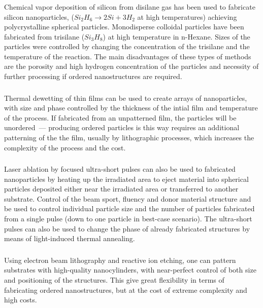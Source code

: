         \subsubsection{}
                Chemical vapor deposition of silicon from disilane gas has been used to fabricate silicon nanoparticles, ($Si_2H_6 \rightarrow 2Si + 3H_2$ at
            high temperatures) achieving polycrystalline spherical particles. Monodisperse colloidal particles have been fabricated from trisilane ($Si_3H_8$)
            at high temperature in n-Hexane. Sizes of the particles were controlled by changing the concentration of the trisilane and the temperature of the
            reaction. The main disadvantages of these types of methods are the porosity and high hydrogen concentration of the particles and necessity of
            further processing if ordered nanostructures are required.

        \subsubsection{}
                Thermal dewetting of thin films can be used to create arrays of nanoparticles, with size and phase controlled by the thickness of the intial
            film and temperature of the process. If fabricated from an unpatterned film, the particles will be unordered~--- producing ordered particles is this
            way requires an additional patterning of the the film, usually by lithographic processes, which increases the complexity of the process and the cost.
        \subsubsection{}
                Laser ablation by focused ultra-short pulses can also be used to fabricated nanoparticles by heating up the irradiated area to eject material into
            spherical particles deposited either near the irradiated area or transferred to another substrate. Control of the beam sport, fluency and donor material
            structure and be used to control individual particle size and the number of particles fabricated from a single pulse (down to one particle in best-case
            scenario). The ultra-short pulses can also be used to change the phase of already fabricated structures by means of light-induced thermal annealing.
        \subsubsection{}
                Using electron beam lithography and reactive ion etching, one can pattern substrates with high-quality nanocylinders, with near-perfect
            control of both size and positioning of the structures. This give great flexibility in terms of fabricating ordered nanostructures, but at the
            cost of extreme complexity and high costs.

